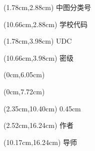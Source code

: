 \begin{titlepage}
    \thispagestyle{empty}
    \label{page:inner-cover}
    \null

\begin{textblock*}{7.2cm}(1.78cm,2.88cm)
    {\songti{}中图分类号\JOUUnderlineBox{3.15cm}{\JOUClassificationNumber}}
\end{textblock*}

\begin{textblock*}{7.2cm}(10.66cm,2.88cm)
    {\songti{}学校代码\JOUUnderlineBox{2.45cm}{\JOUUniversityCode}}
\end{textblock*}

\begin{textblock*}{7.2cm}(1.78cm,3.98cm)
    {\songti{}UDC\JOUUnderlineBox{4.00cm}{\JOUUDC}}
\end{textblock*}

\begin{textblock*}{7.2cm}(10.66cm,3.98cm)
    {\songti{}密\hspace{1em}级\JOUUnderlineBox{2.45cm}{\JOUConfidentiality}}
\end{textblock*}

\begin{textblock*}{21cm}(0cm,6.05cm)
\end{textblock*}

\begin{textblock*}{21cm}(0cm,7.72cm)
\end{textblock*}

\begin{textblock*}{16.3cm}(2.35cm,10.40cm)
    \JOUStackedCenteredBlock
        {{\JOUHeadingHei\bfseries{}\JOUChineseTitle}}
        {{\rmfamily\bfseries\fontsize{22pt}{31.2pt}\selectfont \JOUEnglishTitle}}
        {0.45cm}
\end{textblock*}

\begin{textblock*}{6.2cm}(2.52cm,16.24cm)
    {\songti{}作\hspace{2em}者\JOUUnderlineBox{3.05cm}{\JOUAuthorDisplay}}
\end{textblock*}
\begin{textblock*}{6.2cm}(10.17cm,16.24cm)
    {\songti{}导\hspace{2em}师\JOUUnderlineBox{3.05cm}{\JOUSupervisorNameDisplay}}
\end{textblock*}


\end{titlepage}
